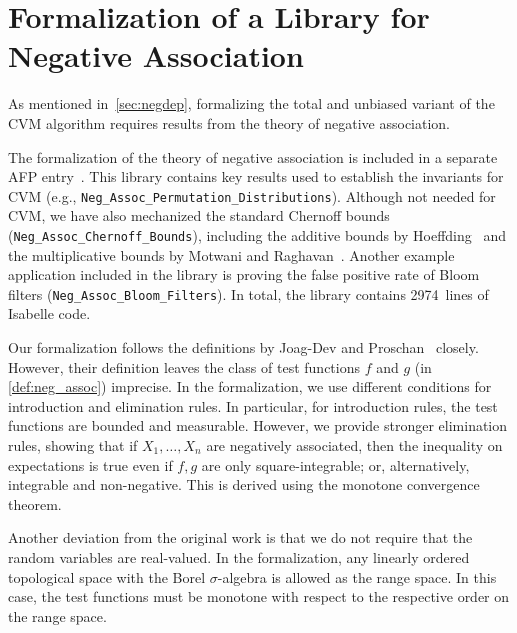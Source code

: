 \section{Formalization of a Library for Negative Association}\label{sec:formalization_neg_dep}
As mentioned in~\cref{sec:negdep}, formalizing the total and unbiased variant of the CVM algorithm requires results from the theory of negative association.

\begin{note}
The formalization of the theory of negative association is included in a separate AFP entry~\cite{Negative_Association-AFP}.
This library contains key results used to establish the invariants for CVM (e.g., \verb|Neg_Assoc_Permutation_Distributions|).
Although not needed for CVM, we have also mechanized the standard Chernoff bounds (\verb|Neg_Assoc_Chernoff_Bounds|), including the additive bounds by Hoeffding~\cite[Th. 1, 2]{hoeffding1963} and the multiplicative bounds by Motwani and Raghavan~\cite[Th. 4.1, 4.2]{motwani1995}.
Another example application included in the library is proving the false positive rate of Bloom filters (\verb|Neg_Assoc_Bloom_Filters|).
In total, the library contains 2974~lines of Isabelle code.
\lipicsEnd\end{note}

Our formalization follows the definitions by Joag-Dev and Proschan~\cite{joagdev1983} closely.
However, their definition leaves the class of test functions $f$ and $g$ (in \cref{def:neg_assoc}) imprecise.
In the formalization, we use different conditions for introduction and elimination rules.
In particular, for introduction rules, the test functions are bounded and measurable.
However, we provide stronger elimination rules, showing that if $X_1,\dots,X_n$ are negatively associated, then the inequality on expectations is true even if $f, g$ are only square-integrable; or, alternatively, integrable and non-negative. This is derived using the monotone convergence theorem.

Another deviation from the original work is that we do not require that the random variables are real-valued.
In the formalization, any linearly ordered topological space with the Borel $\sigma$-algebra is allowed as the range space.
In this case, the test functions must be monotone with respect to the respective order on the range space.

